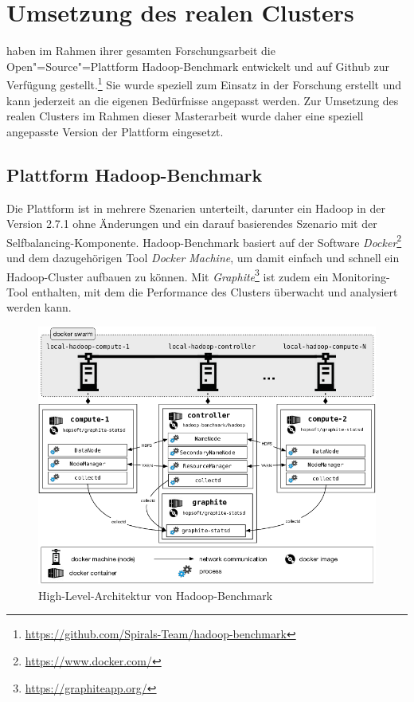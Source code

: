 \section{Umsetzung des realen Clusters}\label{sec:aufbauCluster}

\citeauthor{zhang2016} haben im Rahmen ihrer gesamten Forschungsarbeit die Open"=Source"=Plattform Hadoop-Benchmark entwickelt und auf Github zur Verfügung gestellt.\footnote{\url{https://github.com/Spirals-Team/hadoop-benchmark}} Sie wurde speziell zum Einsatz in der Forschung erstellt und kann jederzeit an die eigenen Bedürfnisse angepasst werden. Zur Umsetzung des realen Clusters im Rahmen dieser Masterarbeit wurde daher eine speziell angepasste Version der Plattform eingesetzt.

\subsection{Plattform Hadoop-Benchmark}\label{sec:hadoopBenchmark}

Die Plattform ist in mehrere Szenarien unterteilt, darunter ein Hadoop in der Version 2.7.1 ohne Änderungen und ein darauf basierendes Szenario mit der Selfbalancing-Komponente. Hadoop-Benchmark basiert auf der Software \emph{Docker}\footnote{\url{https://www.docker.com/}} und dem dazugehörigen Tool \emph{Docker Machine}, um damit einfach und schnell ein Hadoop-Cluster aufbauen zu können. Mit \emph{Graphite}\footnote{\url{https://graphiteapp.org/}} ist zudem ein Monitoring-Tool enthalten, mit dem die Performance des Clusters überwacht und analysiert werden kann.

\begin{figure}
    \centering
    \includegraphics[width=.8\columnwidth]{./images/hadoopBenchmarkArch.png}
    \caption[High-Level-Architektur von Hadoop-Benchmark]{High-Level-Architektur von Hadoop-Benchmark \cite{abb:hadoopBenchmarkArch}}
    \label{fig:hadoopBenchmarkArchitecture}
\end{figure}

